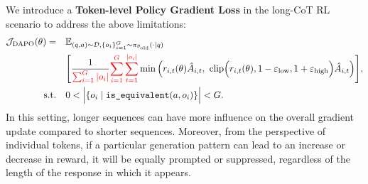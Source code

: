 We introduce a \textbf{Token-level Policy Gradient Loss} in the long-CoT RL scenario to address the above limitations:
\begin{equation}
\begin{aligned}
\mathcal{J}_{\text{DAPO}}(\theta) = \quad&\mathbb{E}_{(q,a)\sim \mathcal{D}, \{o_i\}_{i=1}^G\sim \pi_{\theta_\text{old}}(\cdot\mid q)}\\&
\Bigg[\frac{1}{\color{red}\sum_{i=1}^{G}|o_i|}{\color{red}\sum_{i=1}^{G}\sum_{t=1}^{|o_i|}} 
\min \Big( r_{i,t}(\theta) \hat{A}_{i,t},  
\ \text{clip} \Big( r_{i,t}(\theta), 1 - {\varepsilon_{\text{low}}}, 1 + {\varepsilon_{\text{high}}} \Big) \hat{A}_{i,t} \Big) \Bigg],\\
\text{s.t.}\quad& 0< \Big|\{o_i\mid\texttt{is\_equivalent}(a,o_i)\}\Big|< G.
\label{eq:dapoloss_token_level_pg_loss}
\end{aligned}
\end{equation}
In this setting, longer sequences can have more influence on the overall gradient update compared to shorter sequences. 
Moreover, from the perspective of individual tokens, if a particular generation pattern can lead to an increase or decrease in reward, it will be equally prompted or suppressed, regardless of the length of the response in which it appears.



